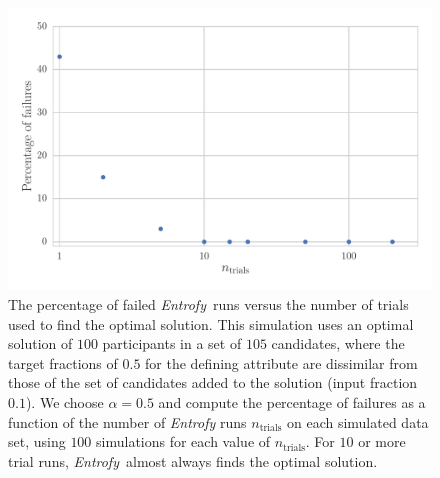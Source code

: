 \documentclass[12pt]{article}
\newcommand{\project}[1]{\textsl{#1}}
\newcommand{\entrofy}{\project{Entrofy}}
\begin{document}
\begin{figure}[htbp]
\begin{center}
\includegraphics[width=5in]{f2.pdf}
\caption{The percentage of failed \entrofy\ runs versus the number of 
trials used to find the optimal solution. This simulation uses an optimal solution of $100$ participants in a set of $105$ candidates, where the target fractions of $0.5$ for the defining attribute are dissimilar from those of the set of candidates added to the solution (input fraction $0.1$). We choose $\alpha = 0.5$ and compute the percentage of failures as a function of the number of \textit{Entrofy} runs $n_\mathrm{trials}$ on each simulated data set, using $100$ simulations for each value of $n_\mathrm{trials}$.
For $10$ or more trial runs, \entrofy\ almost always finds the optimal solution.
}
\label{fig:experiments2}
\end{center}
\end{figure}

\clearpage
\end{document}
